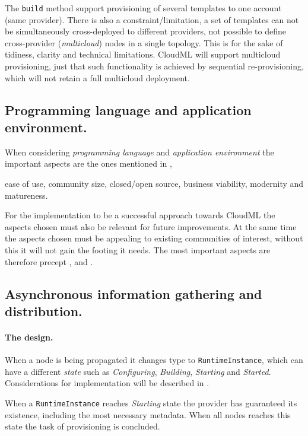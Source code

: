 The \texttt{build} method support provisioning of several templates to one account (same provider).
There is also a constraint/limitation, a set of templates can not be simultaneously 
cross-deployed to different providers,
\ie not possible to define cross-provider (\emph{multicloud}) nodes in a single topology.
This is for the sake of tidiness, clarity and technical limitations.
CloudML will support multicloud provisioning,
just that such functionality is achieved by sequential re-provisioning,
which will not retain a full multicloud deployment.


\subsection{Programming language and application environment.}

When considering \emph{programming language} and \emph{application environment} 
the important aspects are the ones mentioned in ,
\begin{ii}
  \iitem ease of use,
  \iitem community size,
  \iitem closed/open source,
  \iitem business viability,
  \iitem modernity and 
  \iitem matureness.
\end{ii}
For the implementation to be a successful approach towards CloudML 
the aspects chosen must also be relevant for future improvements.
At the same time the aspects chosen must be appealing to existing communities of interest,
without this it will not gain the footing it needs.
The most important aspects are therefore precept ,  and .

\subsection{Asynchronous information gathering and distribution.}

\paragraph{The design.}

When a node is being propagated it changes type to 
\texttt{RuntimeInstance}, which can have a different \emph{state} such as 
\emph{Configuring}, \emph{Building}, \emph{Starting} and \emph{Started}.
Considerations for implementation will be described in .

When a \texttt{RuntimeInstance} reaches \emph{Starting} state the provider 
has guaranteed its existence, including the most necessary metadata.
When all nodes reaches this state the task of provisioning is concluded.

